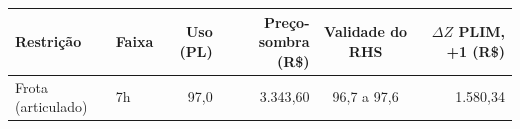 \begin{tabular}{llrrcr}
\toprule
Restrição & Faixa & Uso (PL) & Preço-sombra (R\$) & Validade do RHS & $\Delta Z$ PLIM, +1 (R\$) \\
\midrule
Frota (articulado) & 7h & 97{,}0 & 3.343{,}60 & 96{,}7 a 97{,}6 & 1.580{,}34 \\
\bottomrule
\end{tabular}
